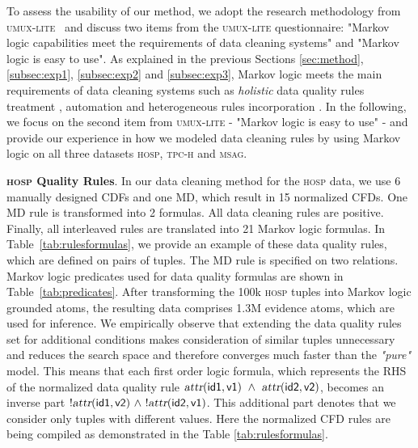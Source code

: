 To assess the usability of our method, we adopt the research methodology from \textsc{umux-lite}~\cite{Lewis2013UMUX, Finstad2010} and discuss two items from the \textsc{umux-lite} questionnaire: "Markov logic capabilities meet the requirements of data cleaning systems" and "Markov logic is easy to use". As explained in the previous Sections \ref{sec:method}, \ref{subsec:exp1}, \ref{subsec:exp2} and \ref{subsec:exp3}, Markov logic meets the main requirements of data cleaning systems such as \textit{holistic} data quality rules treatment \cite{Fan:2014:IRM:2628135.2567657, Dallachiesa:2013:NCD:2463676.2465327}, automation \cite{Stonebraker_datacuration} and heterogeneous rules incorporation \cite{chu2013holistic}. In the following, we focus on the second item from \textsc{umux-lite} - "Markov logic is easy to use" - and provide our experience in how we modeled data cleaning rules by using Markov logic on all three datasets \textsc{hosp}, \textsc{tpc-h} and \textsc{msag}. %

\textbf{\textsc{hosp} Quality Rules}. In our data cleaning method for the \textsc{hosp} data, we use 6 manually designed CDFs and one MD, which result in 15 normalized CFDs. One MD rule is transformed into 2 formulas. All data cleaning rules are positive. Finally, all interleaved rules are translated into 21 Markov logic formulas. In Table~\ref{tab:rulesformulas}, we provide an example of these data quality rules, which are defined on pairs of tuples. The MD rule is specified on two relations. Markov logic predicates used for data quality formulas are shown in Table~\ref{tab:predicates}. After transforming the 100k \textsc{hosp} tuples into Markov logic grounded atoms, the resulting data comprises 1.3M evidence atoms, which are used for inference. We empirically observe that extending the data quality rules set for additional conditions makes consideration of similar tuples unnecessary and reduces the search space and therefore converges much faster than the \textit{"pure"} model. This means that each first order logic formula, which represents the RHS of the normalized data quality rule $\mathsf{\textsl{attr}(id1, v1)~\wedge~\textsl{attr}(id2, v2)}$, becomes an inverse part $\mathsf{!\textsl{attr}(id1, v2)~\wedge~!\textsl{attr}(id2, v1)}$. This additional part denotes that we consider only tuples with different values. Here the normalized CFD rules are being compiled as demonstrated in the Table \ref{tab:rulesformulas}. 

